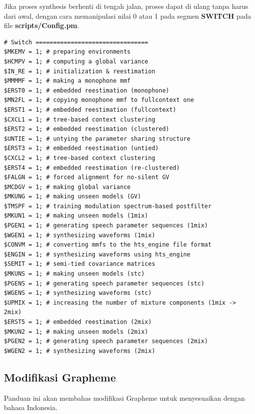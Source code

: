 \documentclass[12pt,]{article}
\begin{document}
	Jika proses synthesis berhenti di tengah jalan, proses dapat di ulang tanpa harus dari awal,
	dengan cara memanipulasi nilai 0 atau 1 pada segmen \textbf{SWITCH} pada file \textbf{scripts/Config.pm}.

	\begin{verbatim}
# Switch ================================
$MKEMV = 1; # preparing environments
$HCMPV = 1; # computing a global variance
$IN_RE = 1; # initialization & reestimation
$MMMMF = 1; # making a monophone mmf
$ERST0 = 1; # embedded reestimation (monophone)
$MN2FL = 1; # copying monophone mmf to fullcontext one
$ERST1 = 1; # embedded reestimation (fullcontext)
$CXCL1 = 1; # tree-based context clustering
$ERST2 = 1; # embedded reestimation (clustered)
$UNTIE = 1; # untying the parameter sharing structure
$ERST3 = 1; # embedded reestimation (untied)
$CXCL2 = 1; # tree-based context clustering
$ERST4 = 1; # embedded reestimation (re-clustered)
$FALGN = 1; # forced alignment for no-silent GV
$MCDGV = 1; # making global variance
$MKUNG = 1; # making unseen models (GV)
$TMSPF = 1; # training modulation spectrum-based postfilter
$MKUN1 = 1; # making unseen models (1mix)
$PGEN1 = 1; # generating speech parameter sequences (1mix)
$WGEN1 = 1; # synthesizing waveforms (1mix)
$CONVM = 1; # converting mmfs to the hts_engine file format
$ENGIN = 1; # synthesizing waveforms using hts_engine
$SEMIT = 1; # semi-tied covariance matrices
$MKUNS = 1; # making unseen models (stc)
$PGENS = 1; # generating speech parameter sequences (stc)
$WGENS = 1; # synthesizing waveforms (stc)
$UPMIX = 1; # increasing the number of mixture components (1mix -> 2mix)
$ERST5 = 1; # embedded reestimation (2mix)
$MKUN2 = 1; # making unseen models (2mix)
$PGEN2 = 1; # generating speech parameter sequences (2mix)
$WGEN2 = 1; # synthesizing waveforms (2mix)
	\end{verbatim}

	\newpage
	\subsection{Modifikasi Grapheme}

	Panduan ini akan membahas modifikasi Grapheme untuk menyesuaikan dengan bahasa Indonesia.
\end{document}

